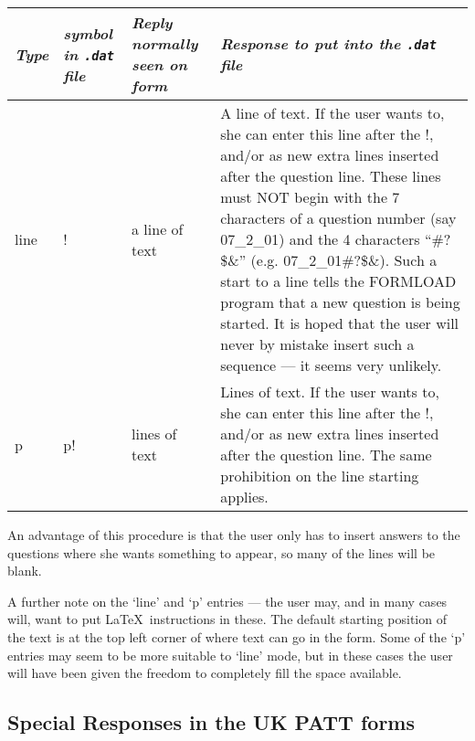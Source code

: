 {\small
\begin{tabular}{|l|p{0.6in}|p{1.2in}|p{3.5in}|} \hline
{\it Type} & {\it symbol in {\tt .dat} file}   & {\it Reply normally seen on
form} & {\it Response to put into the {\tt .dat} file} \\ \hline
line  &     !  &   a line of text  &  A line of text. If the user wants to,
                                      she can enter this line after the !,
                                      and/or as new extra lines inserted
                                      after the question line.
                                      These lines must NOT begin with the
                                      7 characters of a question number
                                      (say 07\_2\_01) and the 4 characters
                                      ``\#?\$\&'' (e.g. 07\_2\_01\#?\$\&). Such a
                                      start to a line tells the FORMLOAD
                                      program that a new question is
                                      being started. It is hoped that the user will
                                      never by mistake insert such a
                                      sequence --- it seems very unlikely. \\  \hline
p     &    p!  & lines of text    &   Lines of text. If the user wants to,
                                      she can enter this line after the !,
                                      and/or as new extra lines inserted
                                      after the question line.
                                      The same prohibition on the line
                                      starting applies. \\  \hline
\end{tabular}}


An advantage of this procedure is that the user only has to insert answers
to the questions where she wants something to appear, so many of the lines
will be blank.

A further note on the `line' and `p' entries --- the user may, and in many
cases will, want to put \LaTeX\ instructions in these. The default starting
position of the text is at the top left corner of where text can go in the
form. Some of the `p' entries may seem to be more suitable to `line' mode,
but in these cases the  user will have been given the freedom to completely
fill the space available.

\subsection {Special Responses in the UK PATT forms}

